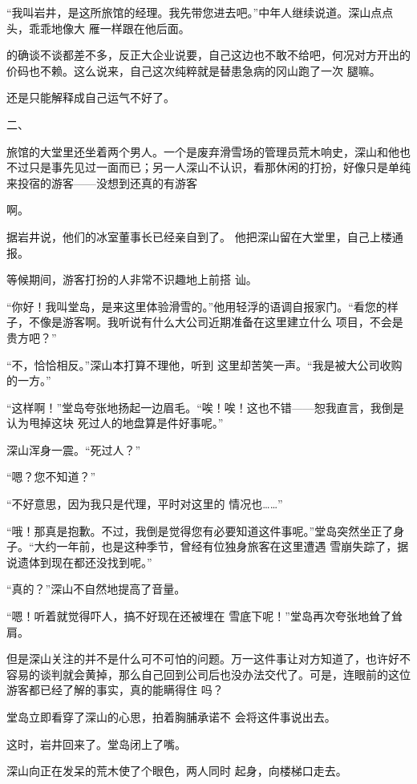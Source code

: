 \documentclass{article}
\begin{document}
“我叫岩井，是这所旅馆的经理。我先带您进去吧。”中年人继续说道。深山点点头，乖乖地像大
雁一样跟在他后面。 

的确谈不谈都差不多，反正大企业说要，自己这边也不敢不给吧，何况对方开出的价码也不赖。这么说来，自己这次纯粹就是替患急病的冈山跑了一次
腿嘛。 


还是只能解释成自己运气不好了。 


二、 

旅馆的大堂里还坐着两个男人。一个是废弃滑雪场的管理员荒木响史，深山和他也不过只是事先见过一面而已；另一人深山不认识，看那休闲的打扮，好像只是单纯来投宿的游客——没想到还真的有游客

\newpage
啊。 

据岩井说，他们的冰室董事长已经亲自到了。
他把深山留在大堂里，自己上楼通报。 

等候期间，游客打扮的人非常不识趣地上前搭
讪。 

“你好！我叫堂岛，是来这里体验滑雪的。”他用轻浮的语调自报家门。“看您的样子，不像是游客啊。我听说有什么大公司近期准备在这里建立什么
项目，不会是贵方吧？” 

“不，恰恰相反。”深山本打算不理他，听到
这里却苦笑一声。“我是被大公司收购的一方。” 

“这样啊！”堂岛夸张地扬起一边眉毛。“唉！唉！这也不错——恕我直言，我倒是认为甩掉这块
死过人的地盘算是件好事呢。” 


深山浑身一震。“死过人？” 

\newpage


“嗯？您不知道？” 

“不好意思，因为我只是代理，平时对这里的
情况也……” 

“哦！那真是抱歉。不过，我倒是觉得您有必要知道这件事呢。”堂岛突然坐正了身子。“大约一年前，也是这种季节，曾经有位独身旅客在这里遭遇
雪崩失踪了，据说遗体到现在都还没找到呢。” 


“真的？”深山不自然地提高了音量。 

“嗯！听着就觉得吓人，搞不好现在还被埋在
雪底下呢！”堂岛再次夸张地耸了耸肩。 

但是深山关注的并不是什么可不可怕的问题。万一这件事让对方知道了，也许好不容易的谈判就会黄掉，那么自己回到公司后也没办法交代了。可是，连眼前的这位游客都已经了解的事实，真的能瞒得住
吗？ 

\newpage

堂岛立即看穿了深山的心思，拍着胸脯承诺不
会将这件事说出去。 


这时，岩井回来了。堂岛闭上了嘴。 

深山向正在发呆的荒木使了个眼色，两人同时
起身，向楼梯口走去。 
\end{document}
